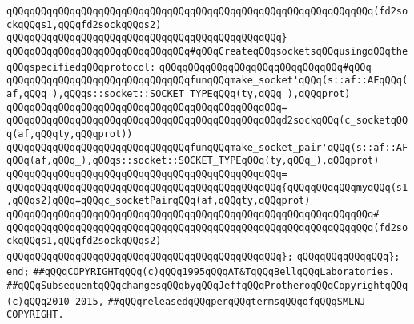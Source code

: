 \verb|qQQqqQQqqQQqqQQqqQQqqQQqqQQqqQQqqQQqqQQqqQQqqQQqqQQqqQQqqQQqqQQq(fd2sockqQQqs1,qQQqfd2sockqQQqs2)|\newline
\verb|qQQqqQQqqQQqqQQqqQQqqQQqqQQqqQQqqQQqqQQqqQQqqQQq}|\newline
\newline
\verb|qQQqqQQqqQQqqQQqqQQqqQQqqQQqqQQq#qQQqCreateqQQqsocketsqQQqusingqQQqtheqQQqspecifiedqQQqprotocol:|\newline
\verb|qQQqqQQqqQQqqQQqqQQqqQQqqQQqqQQq#qQQq|\newline
\verb|qQQqqQQqqQQqqQQqqQQqqQQqqQQqqQQqfunqQQqmake_socket'qQQq(s::af::AFqQQq(af,qQQq_),qQQqs::socket::SOCKET_TYPEqQQq(ty,qQQq_),qQQqprot)|\newline
\verb|qQQqqQQqqQQqqQQqqQQqqQQqqQQqqQQqqQQqqQQqqQQqqQQq=|\newline
\verb|qQQqqQQqqQQqqQQqqQQqqQQqqQQqqQQqqQQqqQQqqQQqqQQqd2sockqQQq(c_socketqQQq(af,qQQqty,qQQqprot))|\newline
\newline
\verb|qQQqqQQqqQQqqQQqqQQqqQQqqQQqqQQqfunqQQqmake_socket_pair'qQQq(s::af::AFqQQq(af,qQQq_),qQQqs::socket::SOCKET_TYPEqQQq(ty,qQQq_),qQQqprot)|\newline
\verb|qQQqqQQqqQQqqQQqqQQqqQQqqQQqqQQqqQQqqQQqqQQqqQQq=|\newline
\verb|qQQqqQQqqQQqqQQqqQQqqQQqqQQqqQQqqQQqqQQqqQQqqQQq{qQQqqQQqqQQqmyqQQq(s1,qQQqs2)qQQq=qQQqc_socketPairqQQq(af,qQQqty,qQQqprot)|\newline
\verb|qQQqqQQqqQQqqQQqqQQqqQQqqQQqqQQqqQQqqQQqqQQqqQQqqQQqqQQqqQQqqQQq#|\newline
\verb|qQQqqQQqqQQqqQQqqQQqqQQqqQQqqQQqqQQqqQQqqQQqqQQqqQQqqQQqqQQqqQQq(fd2sockqQQqs1,qQQqfd2sockqQQqs2)|\newline
\verb|qQQqqQQqqQQqqQQqqQQqqQQqqQQqqQQqqQQqqQQqqQQqqQQq};|\newline
\verb|qQQqqQQqqQQqqQQq};|\newline
\verb|end;|\newline
\newline
\verb|##qQQqCOPYRIGHTqQQq(c)qQQq1995qQQqAT&TqQQqBellqQQqLaboratories.|\newline
\verb|##qQQqSubsequentqQQqchangesqQQqbyqQQqJeffqQQqProtheroqQQqCopyrightqQQq(c)qQQq2010-2015,|\newline
\verb|##qQQqreleasedqQQqperqQQqtermsqQQqofqQQqSMLNJ-COPYRIGHT.|\newline

